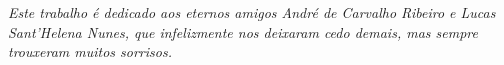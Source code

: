 \begin{dedicatoria}
    \vspace*{\fill}
    \centering
    \noindent
    \textit{
        Este trabalho é dedicado aos eternos amigos André de Carvalho Ribeiro e
        Lucas Sant'Helena Nunes, que infelizmente nos deixaram cedo demais, mas
        sempre trouxeram muitos sorrisos.
    }
    \vspace*{\fill}
\end{dedicatoria}
